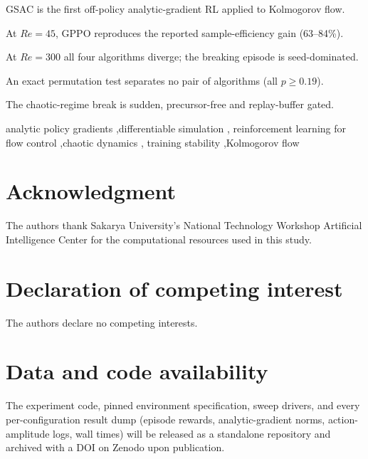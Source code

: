 \documentclass[a4paper,fleqn]{cas-dc}
\renewcommand{\Re}{\mathit{Re}}
\begin{document}
\begin{highlights}
\item GSAC is the first off-policy analytic-gradient RL applied to Kolmogorov flow.
\item At $\Re=45$, GPPO reproduces the reported sample-efficiency gain (63--84\%).
\item At $\Re=300$ all four algorithms diverge; the breaking episode is seed-dominated.
\item An exact permutation test separates no pair of algorithms (all $p\ge0.19$).
\item The chaotic-regime break is sudden, precursor-free and replay-buffer gated.
\end{highlights}

\begin{keywords}
analytic policy gradients \sep differentiable simulation \sep
reinforcement learning for flow control \sep chaotic dynamics \sep
training stability \sep Kolmogorov flow
\end{keywords}

\maketitle










\section*{Acknowledgment}
The authors thank Sakarya University's National Technology Workshop
Artificial Intelligence Center for the computational resources used in this
study.

\section*{Declaration of competing interest}
The authors declare no competing interests.

\section*{Data and code availability}
The experiment code, pinned environment specification, sweep drivers, and
every per-configuration result dump (episode rewards, analytic-gradient
norms, action-amplitude logs, wall times) will be released as a standalone
repository and archived with a DOI on Zenodo upon publication.
\end{document}
